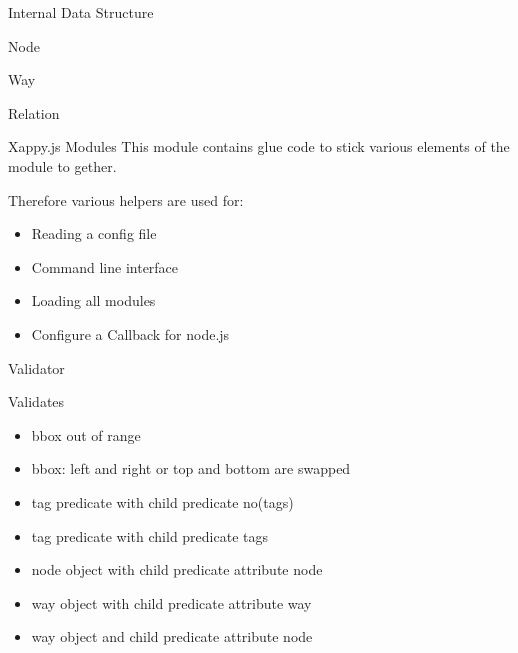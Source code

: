 \documentclass{beamer}
\begin{document}
\begin{frame}{Internal Data Structure}
    \begin{block}{Node}
    \end{block}
    \begin{block}{Way}
    \end{block}
    \begin{block}{Relation}
    \end{block}
\end{frame}

\begin{frame}{Xappy.js Modules}
    This module contains glue code to stick various elements of the module to gether.

    Therefore various helpers are used for:

    \begin{itemize}
        \item Reading a config file
        \item Command line interface
        \item Loading all modules
        \item Configure a Callback for node.js
    \end{itemize}
\end{frame}

\begin{frame}{Validator}

    \begin{block}{Validates}
        \begin{itemize}
            \item bbox out of range
            \item bbox: left and right or top and bottom are swapped
            \item tag predicate with child predicate no(tags)
            \item tag predicate with child predicate tags
            \item node object with child predicate attribute node
            \item way object with child predicate attribute way
            \item way object and child predicate attribute node
        \end{itemize}
    \end{block}

\end{frame}
\end{document}
